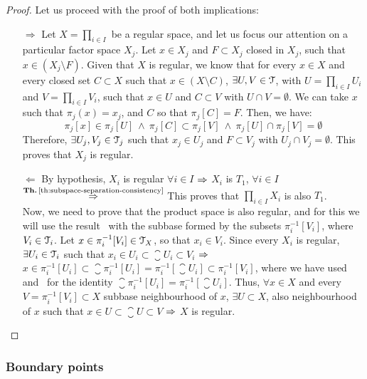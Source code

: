 \begin{proof}
	Let us proceed with the proof of both implications:
	\begin{itemize}
		\item[$\boxed{\Rightarrow}$] Let $X=\prod_{i\in I}$ be a regular space, and let us focus our attention on a particular factor space $X_j$. Let $x\in X_j$ and $F\subset X_j$ closed in $X_j$, such that $x\in (X_j\setminus F)$. Given that $X$ is regular, we know that for every $x\in X$ and every closed set $C\subset X$ such that $x\in (X\setminus C)$, $\exists U,V\in\EuScript{T}$, with $U=\prod_{i\in I}U_i$ and $V=\prod_{i\in I}V_i$, such that $x\in U$ and $C\subset V$ with $U\cap V=\emptyset$. We can take $x$ such that $\pi_j(x)=x_j$, and $C$ so that $\pi_j[C]=F$. Then, we have:
		\[
			\pi_j[x]\in \pi_j[U]\ \land\ \pi_j[C]\subset \pi_j[V]\ \land\ \pi_j[U]\cap \pi_j[V]=\emptyset
		\]
		Therefore, $\exists U_j,V_j\in\EuScript{T}_j$ such that $x_j\in U_j$ and $F\subset V_j$ with $U_j\cap V_j=\emptyset$. This proves that $X_j$ is regular.
		\item[$\boxed{\Leftarrow}$] By hypothesis, $X_i$ is regular $\forall i\in I$ $\Rightarrow$ $X_i$ is $T_1$, $\forall i\in I$ $\overset{\text{\thref{th:subspace-separation-consistency}}}{\Then}$ This proves that $\prod_{i\in I}X_i$ is also $T_1$.\\
		Now, we need to prove that the product space is also regular, and for this we will use the result~ with the subbase formed by the subsets $\pi_i^{-1}[V_i]$, where $V_i\in\EuScript{T}_i$. Let $x\in\pi_i^{-1}[V_i]\in\EuScript{T}_X$, so that $x_i\in V_i$. Since every $X_i$ is regular, $\exists U_i\in \EuScript{T}_i$ such that $x_i\in U_i\subset\closure{U_i}\subset V_i$ $\Rightarrow$ $x\in \pi_i^{-1}[U_i]\subset \closure{\pi_i^{-1}[U_i]}=\pi_i^{-1}[\closure{U_i}]\subset \pi_i^{-1}[V_i]$, where we have used ~ and~ for the identity $\closure{\pi_i^{-1}[U_i]}=\pi_i^{-1}[\closure{U_i}]$. Thus, $\forall x\in X$ and every $V=\pi^{-1}_i[V_i]\subset X$ subbase neighbourhood of $x$, $\exists U\subset X$, also neighbourhood of $x$ such that $x\in U\subset\closure{U}\subset V$ $\Rightarrow$ $X$ is regular.
	\end{itemize}
\end{proof}

\subsubsection{Boundary points}\label{subsubsec:boundary-points}


